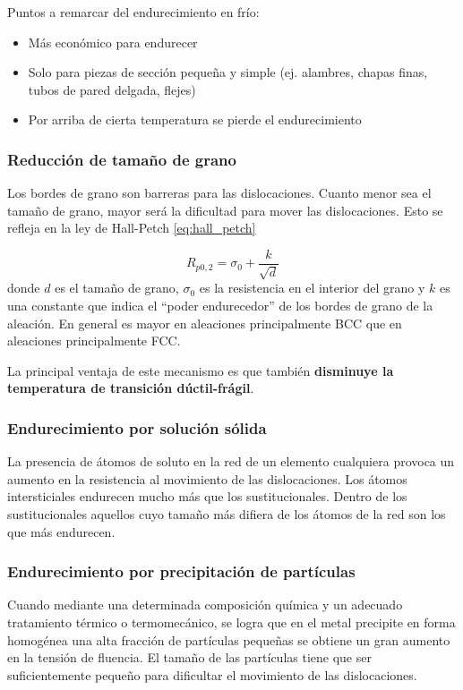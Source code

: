 Puntos a remarcar del endurecimiento en frío:
\begin{itemize}
	\item Más económico para endurecer
	\item Solo para piezas de sección pequeña y simple (ej. alambres, chapas finas, tubos de pared delgada, flejes)
	\item Por arriba de cierta temperatura se pierde el endurecimiento
\end{itemize}

\subsubsection{Reducción de tamaño de grano}
Los bordes de grano son barreras para las dislocaciones. Cuanto menor sea el tamaño de grano, mayor será la dificultad para mover las dislocaciones. Esto se refleja en la ley de Hall-Petch \eqref{eq:hall_petch}

\begin{equation}\label{eq:hall_petch}
	R_{p0,2} = \sigma_0 + \frac{k}{\sqrt{d}}
\end{equation}
donde $d$ es el tamaño de grano, $\sigma_0$ es la resistencia en el interior del grano y $k$ es una constante que indica el ``poder endurecedor'' de los bordes de grano de la aleación. En general es mayor en aleaciones principalmente BCC que en aleaciones principalmente FCC.

La principal ventaja de este mecanismo es que también \textbf{disminuye la temperatura de transición dúctil-frágil}.

\subsubsection{Endurecimiento por solución sólida}

La presencia de átomos de soluto en la red de un elemento cualquiera provoca un aumento en la resistencia al movimiento de las dislocaciones. Los átomos intersticiales endurecen mucho más que los sustitucionales. Dentro de los sustitucionales aquellos cuyo tamaño más difiera de los átomos de la red son los que más endurecen.


\subsubsection{Endurecimiento por precipitación de partículas}

Cuando mediante una determinada composición química y un adecuado tratamiento térmico o termomecánico, se logra que en el metal precipite en forma homogénea una alta fracción de partículas pequeñas se obtiene un gran aumento en la tensión de fluencia. El tamaño de las partículas tiene que ser suficientemente pequeño para dificultar el movimiento de las dislocaciones.

